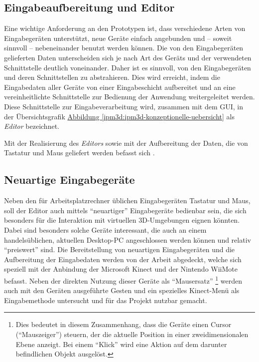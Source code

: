 \documentclass[a4paper,10pt]{sphinxmanual}
\begin{document}
\subsection{Eingabeaufbereitung und Editor}
\label{ipm3d:eingabeaufbereitung-und-editor}
Eine wichtige Anforderung an den Prototypen ist, dass verschiedene Arten von Eingabegeräten unterstützt, neue Geräte einfach angebunden und – soweit sinnvoll – nebeneinander benutzt werden können.
Die von den Eingabegeräten gelieferten Daten unterscheiden sich je nach Art des Geräts und der verwendeten Schnittstelle deutlich voneinander.
Daher ist es sinnvoll, von den Eingabegeräten und deren Schnittstellen zu abstrahieren. Dies wird erreicht, indem die Eingabedaten aller Geräte von einer Eingabeschicht aufbereitet und an eine vereinheitlichte Schnittstelle zur Bedienung der Anwendung weitergeleitet werden. Diese Schnittstelle zur Eingabeverarbeitung wird, zusammen mit dem GUI, in der Übersichtsgrafik \hyperref[ipm3d:ipm3d-konzeptionelle-uebersicht]{Abbildung  \ref*{ipm3d:ipm3d-konzeptionelle-uebersicht}} als \emph{Editor} bezeichnet.

Mit der Realisierung des \emph{Editors} sowie mit der Aufbereitung der Daten, die von Tastatur und Maus geliefert werden befasst sich \cite{uli}.


\subsection{Neuartige Eingabegeräte}
\label{ipm3d:neuartige-eingabegerate}
Neben den für Arbeitsplatzrechner üblichen Eingabegeräten Tastatur und Maus, soll der Editor auch mittels "`neuartiger"' Eingabegeräte bedienbar sein, die sich besonders für die Interaktion mit virtuellen 3D-Umgebungen eignen könnten.
Dabei sind besonders solche Geräte interessant, die auch an einem handelsüblichen, aktuellen Desktop-PC angeschlossen werden können und relativ "`preiswert"' sind.
Die Bereitstellung von neuartigen Eingabegeräten und die Aufbereitung der Eingabedaten werden von der Arbeit \cite{buchi} abgedeckt, welche sich speziell mit der Anbindung der Microsoft Kinect und der Nintendo WiiMote befasst. Neben der direkten Nutzung dieser Geräte als "`Mausersatz"' \footnote{
Dies bedeutet in diesem Zusammenhang, dass die Geräte einen Cursor ("`Mauszeiger"') steuern, der die aktuelle Position in einer zweidimensionalen Ebene anzeigt. Bei einem "`Klick"' wird eine Aktion auf dem darunter befindlichen Objekt ausgelöst.
} werden auch mit den Geräten ausgeführte Gesten und ein spezielles Kinect-Menü als Eingabemethode untersucht und für das Projekt nutzbar gemacht.
\end{document}
